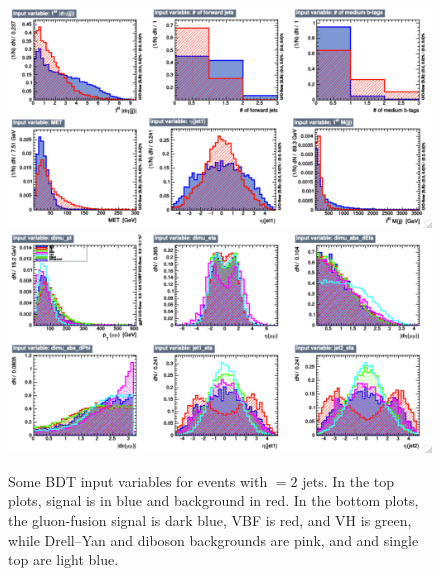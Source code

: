 \begin{figure}
  \includegraphics[width=1.0\linewidth]{figures/bdt_training/BDT_in_eq2j_all_A.pdf}
  \includegraphics[width=1.0\linewidth]{figures/bdt_training/BDT_in_eq2j_sep_A.pdf}
  \caption{Some BDT input variables for events with $= 2$ jets.
           In the top plots, signal is in blue and background in red.
           In the bottom plots, the gluon-fusion signal is dark blue, VBF is red, and VH is green,
           while Drell--Yan and diboson backgrounds are pink, and \ttbar and single top are light blue.}
  \label{fig:BDT_in_eq2j_A}
\end{figure}

